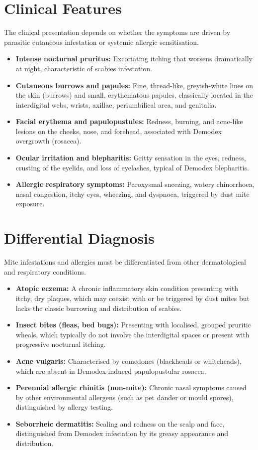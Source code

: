 \section*{Clinical Features}
The clinical presentation depends on whether the symptoms are driven by parasitic cutaneous infestation or systemic allergic sensitisation.
\begin{itemize}
    \item \textbf{Intense nocturnal pruritus:} Excoriating itching that worsens dramatically at night, characteristic of scabies infestation.
    \item \textbf{Cutaneous burrows and papules:} Fine, thread-like, greyish-white lines on the skin (burrows) and small, erythematous papules, classically located in the interdigital webs, wrists, axillae, periumbilical area, and genitalia.
    \item \textbf{Facial erythema and papulopustules:} Redness, burning, and acne-like lesions on the cheeks, nose, and forehead, associated with Demodex overgrowth (rosacea).
    \item \textbf{Ocular irritation and blepharitis:} Gritty sensation in the eyes, redness, crusting of the eyelids, and loss of eyelashes, typical of Demodex blepharitis.
    \item \textbf{Allergic respiratory symptoms:} Paroxysmal sneezing, watery rhinorrhoea, nasal congestion, itchy eyes, wheezing, and dyspnoea, triggered by dust mite exposure.
\end{itemize}

\section*{Differential Diagnosis}
Mite infestations and allergies must be differentiated from other dermatological and respiratory conditions.
\begin{itemize}
    \item \textbf{Atopic eczema:} A chronic inflammatory skin condition presenting with itchy, dry plaques, which may coexist with or be triggered by dust mites but lacks the classic burrowing and distribution of scabies.
    \item \textbf{Insect bites (fleas, bed bugs):} Presenting with localised, grouped pruritic wheals, which typically do not involve the interdigital spaces or present with progressive nocturnal itching.
    \item \textbf{Acne vulgaris:} Characterised by comedones (blackheads or whiteheads), which are absent in Demodex-induced papulopustular rosacea.
    \item \textbf{Perennial allergic rhinitis (non-mite):} Chronic nasal symptoms caused by other environmental allergens (such as pet dander or mould spores), distinguished by allergy testing.
    \item \textbf{Seborrheic dermatitis:} Scaling and redness on the scalp and face, distinguished from Demodex infestation by its greasy appearance and distribution.
\end{itemize}

